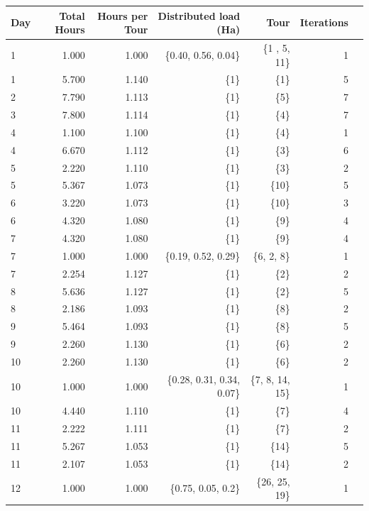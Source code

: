 \documentclass{amsart}
\begin{document}
            \begin{table}[!htp]\centering
            \scriptsize
            \begin{tabular}{lrrrrrr}\toprule
            \textbf{Day} &\textbf{Total Hours} &\textbf{Hours per Tour} &\textbf{Distributed load (Ha)} &\textbf{Tour} &\textbf{Iterations} \\\midrule
            1 &1.000 &1.000 & \{0.40, 0.56, 0.04\} &\{1 , 5, 11\} &1 \\
            1 &5.700 &1.140 & \{1\} & \{1\} &5 \\
            2 &7.790 &1.113 &\{1\} & \{5\} &7 \\
            3 &7.800 &1.114 &\{1\} &  \{4\} &7 \\
            4 &1.100 &1.100 &\{1\} &\{4\} &1 \\
            4 &6.670 &1.112 &\{1\} &\{3\} &6 \\
            5 &2.220 &1.110 &\{1\} &\{3\} &2 \\
            5 &5.367 &1.073 &\{1\} &\{10\} &5 \\
            6 &3.220 &1.073 &\{1\} &\{10\} &3 \\
            6 &4.320 &1.080 &\{1\} &\{9\} &4 \\
            7 &4.320 &1.080 &\{1\} &\{9\} &4 \\
            7 &1.000 &1.000 &\{0.19, 0.52, 0.29\} &\{6, 2, 8\} &1 \\
            7 &2.254 &1.127 &\{1\} &\{2\} &2 \\
            8 &5.636 &1.127 &\{1\} &\{2\} &5 \\
            8 &2.186 &1.093 &\{1\} &\{8\} &2 \\
            9 &5.464 &1.093 &\{1\} &\{8\} &5 \\
            9 &2.260 &1.130 &\{1\} &\{6\} &2 \\
            10 &2.260 &1.130 &\{1\} &\{6\} &2 \\
            10 &1.000 &1.000 &\{0.28, 0.31, 0.34, 0.07\} & \{7, 8, 14, 15\} &1 \\
            10 &4.440 &1.110 &\{1\} &\{7\} &4 \\
            11 &2.222 &1.111 &\{1\} &\{7\} &2 \\
            11 &5.267 &1.053 &\{1\} &\{14\} &5 \\
            11 &2.107 &1.053 &\{1\} &\{14\} &2 \\
            12 &1.000 &1.000 &\{0.75, 0.05, 0.2\} &\{26, 25, 19\} &1 \\

\end{tabular}
\end{table}
\end{document}
